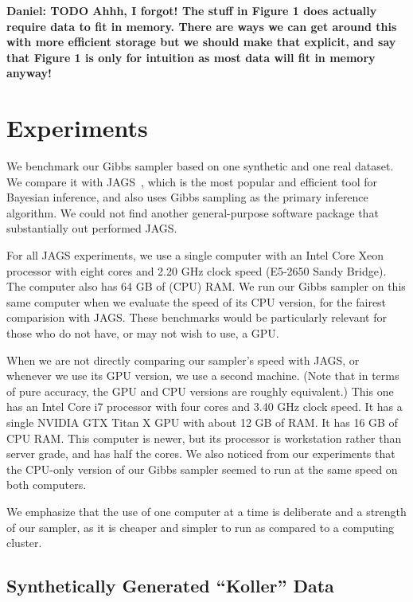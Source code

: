 \documentclass{article} %
\begin{document}
\textbf{Daniel: TODO Ahhh, I forgot! The stuff in Figure 1 does actually require data to fit in
memory. There are ways we can get around this with more efficient storage but we should make that
explicit, and say that Figure 1 is only for intuition as most data will fit in memory anyway!}



\section{Experiments}\label{sec:experiments}

We benchmark our Gibbs sampler based on one synthetic and one real dataset. We compare it with
JAGS~\citep{JAGS2003}, which is the most popular and efficient tool for Bayesian inference, and also
uses Gibbs sampling as the primary inference algorithm. We could not find another general-purpose
software package that substantially out performed JAGS. %

For all JAGS experiments, we use a single computer with an Intel Core Xeon processor with eight
cores and 2.20 GHz clock speed (E5-2650 Sandy Bridge). The computer also has 64 GB of (CPU) RAM. We
run our Gibbs sampler on this same computer when we evaluate the speed of its CPU version, for the
fairest comparision with JAGS. These benchmarks would be particularly relevant for those who do not
have, or may not wish to use, a GPU.
    
When we are not directly comparing our sampler's speed with JAGS, or whenever we use its GPU
version, we use a second machine. (Note that in terms of pure accuracy, the GPU and CPU versions are
roughly equivalent.) This one has an Intel Core i7 processor with four cores and 3.40 GHz clock
speed. It has a single NVIDIA GTX Titan X GPU with about 12 GB of RAM. It has 16 GB of CPU RAM. This
computer is newer, but its processor is workstation rather than server grade, and has half the
cores. We also noticed from our experiments that the CPU-only version of our Gibbs sampler seemed to
run at the same speed on both computers.

We emphasize that the use of one computer at a time is deliberate and a strength of our sampler, as
it is cheaper and simpler to run as compared to a computing cluster.

\subsection{Synthetically Generated ``Koller'' Data}\label{ssec:koller_data}
\end{document}
